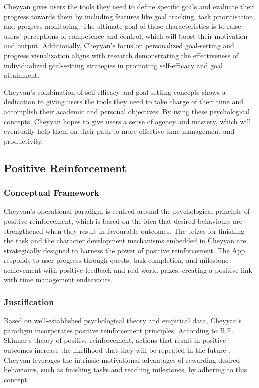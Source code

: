 \documentclass{l4proj}
\begin{document}
Cheyyan gives users the tools they need to define specific goals and evaluate their progress towards them by including features like goal tracking, task prioritisation, and progress monitoring. The ultimate goal of these characteristics is to raise users' perceptions of competence and control, which will boost their motivation and output. Additionally, Cheyyan's focus on personalized goal-setting and progress visualization aligns with research demonstrating the effectiveness of individualized goal-setting strategies in promoting self-efficacy and goal attainment.

Cheyyan's combination of self-efficacy and goal-setting concepts shows a dedication to giving users the tools they need to take charge of their time and accomplish their academic and personal objectives. By using these psychological concepts, Cheyyan hopes to give users a sense of agency and mastery, which will eventually help them on their path to more effective time management and productivity.



\subsection{Positive Reinforcement }
\subsubsection{Conceptual Framework}
Cheyyan's operational paradigm is centred around the psychological principle of positive reinforcement, which is based on the idea that desired behaviours are strengthened when they result in favourable outcomes. The prizes for finishing the task and the character development mechanisms embedded in Cheyyan are strategically designed to harness the power of positive reinforcement. The App responds to user progress through quests, task completion, and milestone achievement with positive feedback and real-world prizes, creating a positive link with time management endeavours.

\subsubsection{Justification}
Based on well-established psychological theory and empirical data, Cheyyan's paradigm incorporates positive reinforcement principles. According to B.F. Skinner's theory of positive reinforcement, actions that result in positive outcomes increase the likelihood that they will be repeated in the future  \cite{ferster1957schedules}. Cheyyan leverages the intrinsic motivational advantages of rewarding desired behaviours, such as finishing tasks and reaching milestones, by adhering to this concept.
\end{document}
